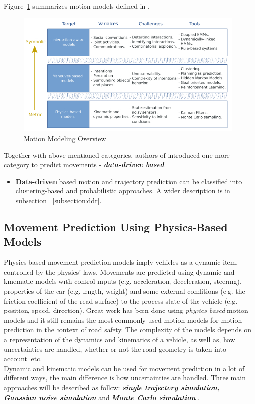 Figure~\ref{fig:MotModOv} summarizes motion models defined in \cite{ClassificationI}.

\begin{figure}[h]
	\centering  	
	\includegraphics[width=13cm]{img/2.jpg}
	\caption{Motion Modeling Overview \cite{ClassificationI}}
	\label{fig:MotModOv}    
\end{figure}

Together with above-mentioned categories, authors of \cite{ClassificationII} introduced one more category to predict movements - \textbf{\textit{data-driven based}}.

\begin{itemize}
	\item \textbf{Data-driven} based motion and trajectory prediction can be classified into clustering-based and probabilistic approaches. A wider description is in subsection ~\ref{subsection:ddr}.
\end{itemize}

\subsection{Movement Prediction Using Physics-Based Models}
\label{subsection:phb}

Physics-based movement prediction models imply vehicles as a dynamic item, controlled by the physics' laws. Movements are predicted using dynamic and kinematic models with control inputs (e.g. acceleration, deceleration, steering), properties of the car (e.g. length, weight) and some external conditions (e.g. the friction coefficient of the road surface) to the process state of the vehicle (e.g. position, speed, direction). Great work has been done using \textit{physics-based} motion models and it still remains the most commonly used motion models for motion prediction in the context of road safety. The complexity of the models depends on a representation of the dynamics and kinematics of a vehicle, as well as, how uncertainties are handled, whether or not the road geometry is taken into account, etc. \\
Dynamic and kinematic models can be used for movement prediction in a lot of different ways, the main difference is how uncertainties are handled. Three main approaches will be described as follow: \textbf{\textit{single trajectory simulation, Gaussian noise simulation}} and \textbf{\textit{Monte Carlo simulation}} \cite{ClassificationI}.

